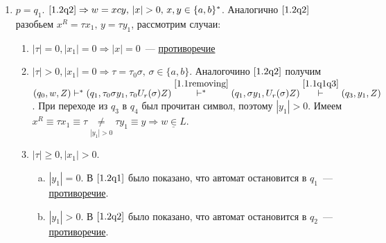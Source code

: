 \documentclass[a4paper]{article}
\begin{document}
\begin{enumerate}[1.]
\begin{enumerate}
\begin{enumerate}
\item $p=q_1$. $\ref{1.2q2}\Rightarrow w=xcy,\,|x|>0,\,x,y\in\{a,b\}^*$. Аналогично $\ref{1.2q2}$ разобьем $x^R=\tau x_1,\,y=\tau y_1$, рассмотрим случаи:\begin{enumerate}
\item $|\tau|=0,|x_1|=0\Rightarrow|x|=0$~--- \underline{противоречие}
\item $|\tau|>0,|x_1|=0\Rightarrow\tau=\tau_0\sigma,\,\sigma\in\{a,b\}$. Аналогочино $\ref{1.2q2}$ получим $(q_0,w,Z)\vdash^*(q_1,\tau_0\sigma y_1,\tau_0 U_r(\sigma)Z)\overset{\ref{1.1removing}}{\vdash^*}(q_1,\sigma y_1,U_r(\sigma)Z)\overset{\ref{1.1q1q3}}{\vdash}(q_3,y_1,Z)$. При переходе из $q_3$ в $q_4$ был прочитан символ, поэтому $|y_1|>0$. Имеем $x^R\equiv\tau x_1\equiv\tau\underset{|y_1|>0}{\neq}\tau y_1\equiv y\Rightarrow\underline{w\in L}$.
\item $|\tau|\geqslant 0,|x_1|>0$.\begin{enumerate}[a.]
\item $|y_1|=0$. В $\ref{1.2q1}$ было показано, что автомат остановится в $q_1$~--- \underline{противоречие}.
\item $|y_1|>0$. В $\ref{1.2q2}$ было показано, что автомат остановится в $q_2$~--- \underline{противоречие}.
\end{enumerate}
\end{enumerate}
\end{enumerate}
\end{enumerate}
\end{enumerate}
\newpage
\end{document}
